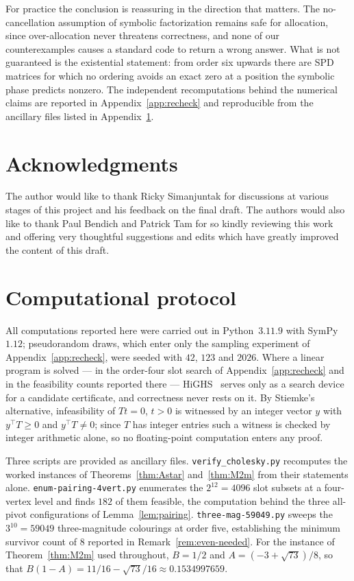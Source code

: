 \documentclass[11pt]{article}
\theoremstyle{plain}
\theoremstyle{definition}
\begin{document}
\begin{humanblock}
For practice the conclusion is reassuring in the direction that matters. The no-cancellation assumption
of symbolic factorization remains safe for allocation, since over-allocation never threatens
correctness, and none of our counterexamples causes a standard code to return a wrong answer. What is
not guaranteed is the existential statement: from order six upwards there are SPD matrices for which no
ordering avoids an exact zero at a position the symbolic phase predicts nonzero. The independent
recomputations behind the numerical claims are reported in Appendix~\ref{app:recheck} and reproducible
from the ancillary files listed in Appendix~\ref{app:protocol}.
\end{humanblock}

\section*{Acknowledgments}

The author would like to thank Ricky Simanjuntak for discussions at various stages of this project and his feedback on the final draft. The authors would also like to thank Paul Bendich and Patrick Tam for so kindly reviewing this work and offering very thoughtful suggestions and edits which have greatly improved the content of this draft. 


\appendix
\section{Computational protocol}\label{app:protocol}
\begin{humanblock}
All computations reported here were carried out in Python~$3.11.9$ with SymPy~$1.12$; pseudorandom
draws, which enter only the sampling experiment of Appendix~\ref{app:recheck}, were seeded with $42$,
$123$ and $2026$. Where a linear program is solved --- in the order-four slot search of
Appendix~\ref{app:recheck} and in the feasibility counts reported there --- HiGHS~\cite{HiGHS} serves
only as a search device for a candidate certificate, and correctness never rests on it. By Stiemke's
alternative, infeasibility of $Tt=0$, $t>0$ is witnessed by an integer vector $y$ with
$y^\top T\ge0$ and $y^\top T\neq0$; since $T$ has integer entries such a witness is checked by integer
arithmetic alone, so no floating-point computation enters any proof.

Three scripts are provided as ancillary files. \texttt{verify\_cholesky.py} recomputes the worked
instances of Theorems~\ref{thm:Astar} and~\ref{thm:M2m} from their statements alone.
\texttt{enum-pairing-4vert.py} enumerates the $2^{12}=4096$ slot subsets at a four-vertex level and
finds $182$ of them feasible, the computation behind the three all-pivot configurations of
Lemma~\ref{lem:pairing}. \texttt{three-mag-59049.py} sweeps the $3^{10}=59049$ three-magnitude
colourings at order five, establishing the minimum survivor count of $8$ reported in
Remark~\ref{rem:even-needed}. For the instance of Theorem~\ref{thm:M2m} used throughout, $B=1/2$ and
$A=(-3+\sqrt{73})/8$, so that $B(1-A)=11/16-\sqrt{73}/16\approx0.1534997659$.
\end{humanblock}
\end{document}
